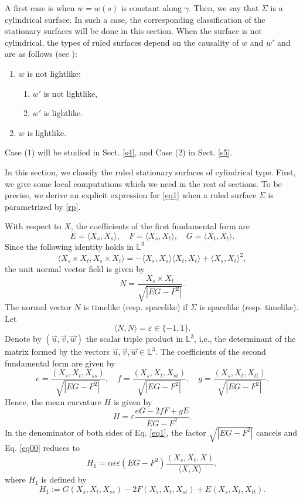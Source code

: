 \documentclass[a4paper,12pt]{amsart}
\theoremstyle{definition}
\def\l{\mathbb L}
\begin{document}
 A first case is when $w=w(s)$ is constant along $\gamma$. Then, we say that $\Sigma$ is a cylindrical surface. In such a case, the corresponding classification of the stationary surfaces will be done in this section. When the surface is not cylindrical, the types of ruled surfaces depend on the causality of $w$ and $w'$ and are as follows  (see \cite{dk}):
\begin{enumerate}
\item $w$ is not lightlike:
\begin{enumerate}
\item[\text{(1a)}] $w'$ is not lightlike,
\item[\text{(1b)}] $w'$ is lightlike.
\end{enumerate}
\item $w$ is lightlike.
\end{enumerate}
Case (1) will be studied in Sect. \ref{s4}, and Case (2) in Sect. \ref{s5}.


In this section, we classify the ruled stationary surfaces of cylindrical type. First, we give some local computations which we need in the rest of sections. To be precise,  we   derive an explicit expression for \eqref{eq1} when a ruled surface $\Sigma$ is parametrized by \eqref{rp}.    

With respect to $X$,  the coefficients of the first fundamental form are
$$
E=\langle X_s,X_s\rangle, \quad F=\langle X_s,X_t\rangle,\quad G=\langle X_t,X_t\rangle.
$$
Since the following identity holds in $\l^3$
$$
\langle X_s\times X_t,X_s\times X_t\rangle=-\langle X_s,X_s\rangle\langle X_t,X_t\rangle+\langle X_s,X_t\rangle^2,
$$
the unit normal vector field is given by
$$
N=\frac{X_s\times X_t}{\sqrt{|EG-F^2|}} .
$$
The normal vector $N$ is timelike (resp. spacelike) if $\Sigma$ is spacelike (resp. timelike). Let 
$$ \langle N,N\rangle=\varepsilon\in\{-1,1\}.$$
Denote by $(\vec{u},\vec{v},\vec{w})$ the scalar triple product in $\l^3$, i.e., the determinant of the matrix formed by the vectors $\vec{u}, \vec{v}, \vec{w}\in \l^3$. The coefficients of the second fundamental form are given by 
$$
e=\frac{(X_s,X_t,X_{ss})}{\sqrt{|EG-F^2|}}, \quad f=\frac{(X_s,X_t,X_{st})}{\sqrt{|EG-F^2|}}, \quad g=\frac{(X_s,X_t,X_{tt})}{\sqrt{|EG-F^2|}}.
$$
Hence, the mean curvature $H$ is given by
$$
H=\varepsilon\frac{eG-2fF+gE}{EG-F^2}. 
$$
In the denominator of both sides of Eq. \eqref{eq1}, the factor $\sqrt{|EG-F^2|}$ cancels and Eq. \eqref{eq00} reduces to
\begin{equation}
H_1=\alpha\epsilon\varepsilon(EG-F^2)\frac{(X_s,X_t,X)}{\langle X,X\rangle}, \label{ss3}
\end{equation}
where $H_1$ is defined by 
$$
H_1:=G(X_s,X_t,X_{ss})-2F(X_s,X_t,X_{st})+E(X_s,X_t,X_{tt}).
$$
\end{document}

